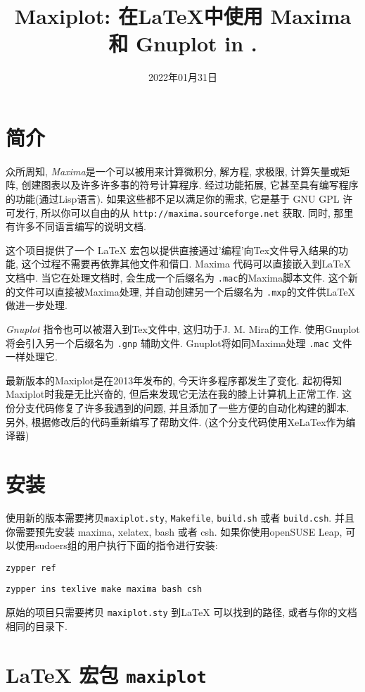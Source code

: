 \documentclass[11pt,a4paper]{article}
\title{Maxiplot: 在\LaTeX 中使用 Maxima 和 Gnuplot in .\\}
\date{2022年01月31日}
\def\Maxima{\emph{Maxima}}
\def\Gnuplot{\emph{Gnuplot}}
\begin{document}
\maketitle

\section{简介}
众所周知, \Maxima 是一个可以被用来计算微积分, 解方程, 求极限, 计算矢量或矩阵, 创建图表以及许多许多事的符号计算程序. 经过功能拓展, 它甚至具有编写程序的功能(通过Lisp语言). 如果这些都不足以满足你的需求, 它是基于 GNU GPL 许可发行, 所以你可以自由的从 \texttt{http://maxima.sourceforge.net} 获取. 同时, 那里有许多不同语言编写的说明文档.

这个项目提供了一个 \LaTeX{} 宏包以提供直接通过'编程'向Tex文件导入结果的功能, 这个过程不需要再依靠其他文件和借口. Maxima 代码可以直接嵌入到\LaTeX{} 文档中. 当它在处理文档时, 会生成一个后缀名为 \texttt{.mac}的Maxima脚本文件. 这个新的文件可以直接被Maxima处理, 并自动创建另一个后缀名为 \texttt{.mxp}的文件供\LaTeX{} 做进一步处理. 

\Gnuplot{} 指令也可以被潜入到Tex文件中, 这归功于J. M. Mira的工作. 使用Gnuplot 将会引入另一个后缀名为 \texttt{.gnp} 辅助文件. Gnuplot将如同Maxima处理 \texttt{.mac} 文件一样处理它.

最新版本的Maxiplot是在2013年发布的, 今天许多程序都发生了变化. 起初得知Maxiplot时我是无比兴奋的, 但后来发现它无法在我的膝上计算机上正常工作. 这份分支代码修复了许多我遇到的问题, 并且添加了一些方便的自动化构建的脚本. 另外, 根据修改后的代码重新编写了帮助文件. (这个分支代码使用XeLaTex作为编译器)

\section{安装}

使用新的版本需要拷贝\texttt{maxiplot.sty}, \texttt{Makefile}, \texttt{build.sh} 或者 \texttt{build.csh}. 并且你需要预先安装 maxima, xelatex, bash 或者 csh. 如果你使用openSUSE Leap, 可以使用sudoers组的用户执行下面的指令进行安装:

\texttt{zypper ref}

\texttt{zypper ins texlive make maxima bash csh}

原始的项目只需要拷贝 \texttt{maxiplot.sty} 到\LaTeX{} 可以找到的路径, 或者与你的文档相同的目录下. 

\section{ \LaTeX{} 宏包 \texttt{maxiplot}}
\end{document}
